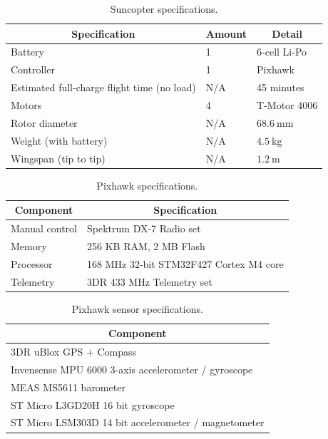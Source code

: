 \begin{table}
  \centering
  \caption{Suncopter specifications.}
  \begin{tabular}{lll}
    \hline
    \multicolumn{1}{c}{Specification} & \multicolumn{1}{c}{Amount} & \multicolumn{1}{c}{Detail} \\ 
    \hline
    Battery & 1 & 6-cell Li-Po \\
    Controller & 1 & Pixhawk \\
    Estimated full-charge flight time (no load) & N/A & 45 minutes \\
    Motors & 4 & T-Motor 4006 \\ 
    Rotor diameter & N/A & $\SI{68.6}{\mm}$ \\ 
    Weight (with battery) & N/A & $\SI{4.5}{\kg}$ \\
    Wingspan (tip to tip) & N/A & $\SI{1.2}{\m}$ \\ 
    \hline
  \end{tabular}
\label{tab:chap5-suncopter-specs}
\end{table}

\begin{table}
  \centering
\caption{Pixhawk specifications.}
  \begin{tabular}{ll}
    \hline
    \multicolumn{1}{c}{Component} & \multicolumn{1}{c}{Specification} \\
    \hline
    Manual control & Spektrum DX-7 Radio set \\
    Memory & 256 KB RAM, 2 MB Flash \\
    Processor & 168 MHz 32-bit STM32F427 Cortex M4 core \\
    Telemetry & 3DR 433 MHz Telemetry set \\
    \hline
  \end{tabular}
\label{tab:chap5-pixhawk-specs}
\end{table}

\begin{table}
  \centering
\caption{Pixhawk sensor specifications.}
  \begin{tabular}{l}
    \hline
    \multicolumn{1}{c}{Component} \\
    \hline
    3DR uBlox GPS + Compass \\
    Invensense MPU 6000 3-axis accelerometer / gyroscope \\
    MEAS MS5611 barometer \\
    ST Micro L3GD20H 16 bit gyroscope \\ 
    ST Micro LSM303D 14 bit accelerometer / magnetometer \\
    \hline
  \end{tabular}
\label{tab:chap5-sensor-specs}
\end{table}

